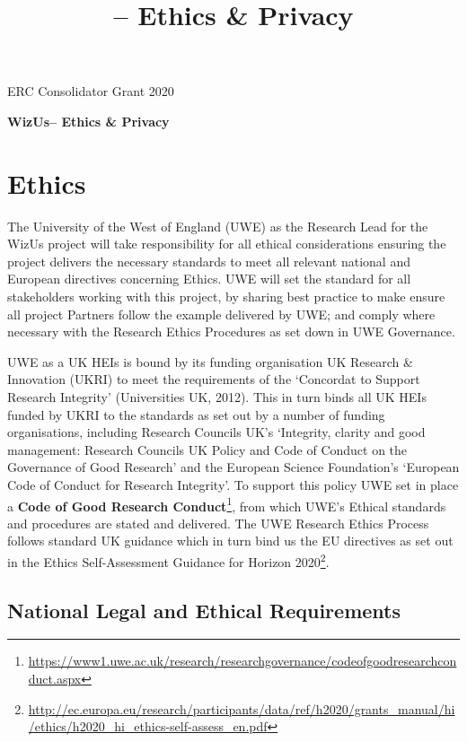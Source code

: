 \documentclass[11pt,a4paper]{report}
\title{\project -- Ethics \& Privacy}
\newcommand{\project}{WizUs\xspace}
\begin{document}
\begin{center}
    ERC Consolidator Grant 2020

    \vspace{2cm}

    \textbf{\LARGE \project -- Ethics \& Privacy}

    \vspace{2cm}

\end{center}

\section{Ethics}

The University of the West of England (UWE) as the Research Lead for the
\project project will take responsibility for all ethical considerations
ensuring the project delivers the necessary standards to meet all relevant
national and European directives concerning Ethics. UWE will set the standard
for all stakeholders working with this project, by sharing best practice to make
ensure all project Partners follow the example delivered by UWE; and comply
where necessary with the Research Ethics Procedures as set down in UWE
Governance. 

UWE as a UK HEIs is bound by its funding organisation UK Research \& Innovation
(UKRI) to meet the requirements of the `Concordat to Support Research Integrity'
(Universities UK, 2012). This in turn binds all UK HEIs funded by UKRI to the
standards as set out by a number of funding organisations, including Research
Councils UK's `Integrity, clarity and good management: Research Councils UK
Policy and Code of Conduct on the Governance of Good Research' and the European
Science Foundation's `European Code of Conduct for Research Integrity'.  To
support this policy UWE set in place a \textbf{Code of Good Research
Conduct}\footnote{\url{https://www1.uwe.ac.uk/research/researchgovernance/codeofgoodresearchconduct.aspx}}, from which
UWE's Ethical standards and procedures are stated and delivered. The UWE
Research Ethics Process follows standard UK guidance which in turn bind us the
EU directives as set out in the Ethics Self-Assessment Guidance for Horizon
2020\footnote{\url{http://ec.europa.eu/research/participants/data/ref/h2020/grants_manual/hi/ethics/h2020_hi_ethics-self-assess_en.pdf}}.

\subsection{National Legal and Ethical Requirements}
\end{document}
